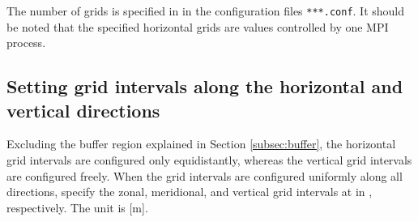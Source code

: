 The number of grids is specified in  in the configuration files \verb|***.conf|. It should be noted that the specified horizontal grids are values controlled by one MPI process.

\subsection{Setting grid intervals along the horizontal and vertical directions} \label{subsec:gridinterv}

Excluding the buffer region explained in Section \ref{subsec:buffer}, the horizontal grid intervals are configured only equidistantly, whereas the
 vertical grid intervals are configured freely. When the grid intervals are  configured uniformly along all directions, specify the zonal, meridional, and vertical grid intervals  at  in , respectively. The unit is [m].

